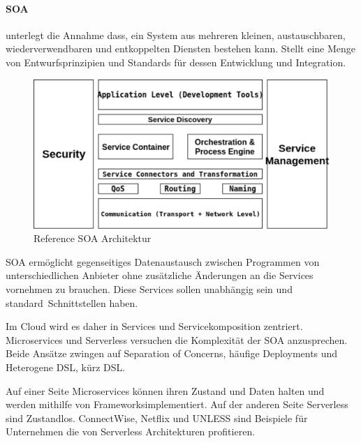 \documentclass[
12pt,
english,
ngerman,
headsepline,
twoside,
openright,
numbers=noenddot,version=first
]{scrreprt}
\begin{document}
\paragraph{\acrfull{SOA}}
\label{sec:soa} unterlegt die Annahme dass, ein System aus mehreren kleinen, austauschbaren, wiederverwendbaren und entkoppelten Diensten bestehen kann. Stellt eine Menge von Entwurfsprinzipien und Standards für dessen Entwicklung und Integration\cite{cloudEssentials}.


\begin{figure}
	\includegraphics[scale=0.60]{./pics/arch-soa.eps}
	\caption{Reference SOA Architektur\cite{archSoa}}
	\label{pic:arch-soa}
\end{figure}

SOA ermöglicht gegenseitiges Datenaustausch zwischen Programmen von unterschiedlichen Anbieter ohne zusätzliche Änderungen an die Services vornehmen zu brauchen. Diese Services sollen unabhängig sein und \glqq standard\grqq\ Schnittstellen haben\cite{archSoa}. 

Im Cloud wird es daher in Services und Servicekomposition zentriert.
Microservices und Serverless versuchen die Komplexität der SOA anzusprechen. Beide Ansätze zwingen auf Separation of Concerns, häufige Deployments und Heterogene \acrfull{DSL}, kürz \acrshort{DSL}.


Auf einer Seite Microservices können ihren Zustand und Daten halten und werden mithilfe von \glqq Frameworks\grqq implementiert. Auf der anderen Seite Serverless sind Zustandlos.
ConnectWise\cite{ConnectWise}, Netflix\cite{Netflix} und UNLESS\cite{UNLESS} sind Beispiele für Unternehmen die von Serverless Architekturen profitieren.
\end{document}
